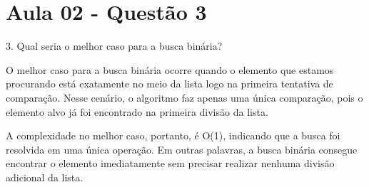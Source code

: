 \section{Aula 02 - Questão 3}

3. Qual seria o melhor caso para a busca binária?

O melhor caso para a busca binária ocorre quando o elemento que estamos procurando está exatamente no meio da lista logo na primeira tentativa de comparação. Nesse cenário, o algoritmo faz apenas uma única comparação, pois o elemento alvo já foi encontrado na primeira divisão da lista.

A complexidade no melhor caso, portanto, é O(1), indicando que a busca foi resolvida em uma única operação. Em outras palavras, a busca binária consegue encontrar o elemento imediatamente sem precisar realizar nenhuma divisão adicional da lista. 
